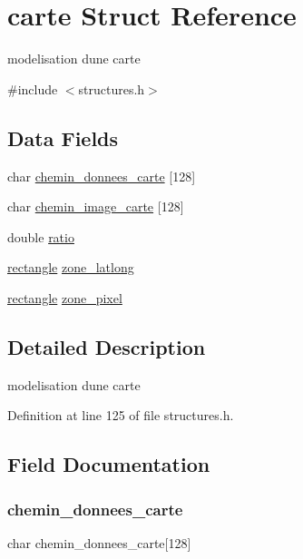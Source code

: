 \hypertarget{structcarte}{}\section{carte Struct Reference}
\label{structcarte}


modelisation d\textquotesingle{}une carte  




{\ttfamily \#include $<$structures.\+h$>$}

\subsection*{Data Fields}
\begin{DoxyCompactItemize}
\item 
char \hyperlink{structcarte_aac690e5d54248ece98a26eb60fd0c179}{chemin\+\_\+donnees\+\_\+carte} \mbox{[}128\mbox{]}
\item 
char \hyperlink{structcarte_a14ecc94c2719b58bbfd7b6249ff3ad4b}{chemin\+\_\+image\+\_\+carte} \mbox{[}128\mbox{]}
\item 
double \hyperlink{structcarte_aa422b0077d0c570937a73aa5b8eb4440}{ratio}
\item 
\hyperlink{structrectangle}{rectangle} \hyperlink{structcarte_ad42edc35194368fcf17c221930cbabe0}{zone\+\_\+latlong}
\item 
\hyperlink{structrectangle}{rectangle} \hyperlink{structcarte_addf5558f9faa154e716d68678b042f98}{zone\+\_\+pixel}
\end{DoxyCompactItemize}


\subsection{Detailed Description}
modelisation d\textquotesingle{}une carte 

Definition at line 125 of file structures.\+h.



\subsection{Field Documentation}
\hypertarget{structcarte_aac690e5d54248ece98a26eb60fd0c179}{}\label{structcarte_aac690e5d54248ece98a26eb60fd0c179} 
\subsubsection{\texorpdfstring{chemin\+\_\+donnees\+\_\+carte}{chemin\_donnees\_carte}}
{\footnotesize\ttfamily char chemin\+\_\+donnees\+\_\+carte\mbox{[}128\mbox{]}}



